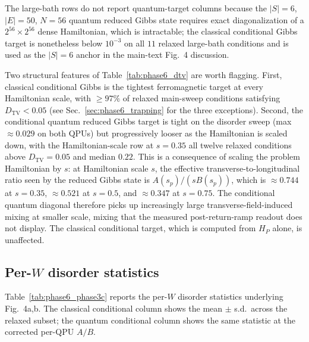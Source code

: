\documentclass[aps,prapplied,reprint,superscriptaddress,floatfix,nofootinbib]{revtex4-2}
\begin{document}
The large-bath rows do not report quantum-target columns because the
$|S|=6$, $|E|=50$, $N=56$ quantum reduced Gibbs state requires exact
diagonalization of a $2^{56}\times 2^{56}$ dense Hamiltonian, which is
intractable; the classical conditional Gibbs target is nonetheless
below $10^{-3}$ on all $11$ relaxed large-bath conditions and is used
as the $|S|=6$ anchor in the main-text Fig.~4 discussion.

Two structural features of
Table~\ref{tab:phase6_dtv} are worth flagging.  First, classical
conditional Gibbs is the tightest ferromagnetic target at every
Hamiltonian scale, with $\ge 97\%$ of relaxed main-sweep conditions
satisfying $D_\mathrm{TV}<0.05$ (see
Sec.~\ref{sec:phase6_trapping} for the three exceptions).  Second, the
conditional quantum reduced Gibbs target is tight on the disorder sweep
(max $\approx 0.029$ on both QPUs) but progressively looser as the
Hamiltonian is scaled down, with the Hamiltonian-scale row at $s=0.35$
all twelve relaxed conditions above $D_\mathrm{TV}=0.05$ and median
$0.22$.  This is a consequence of scaling the problem Hamiltonian by
$s$: at Hamiltonian scale $s$, the effective transverse-to-longitudinal
ratio seen by the reduced Gibbs state is $A(s_p)/(sB(s_p))$, which is
$\approx 0.744$ at $s=0.35$, $\approx 0.521$ at $s=0.5$, and
$\approx 0.347$ at $s=0.75$.  The conditional quantum diagonal
therefore picks up increasingly large transverse-field-induced mixing
at smaller scale, mixing that the measured post-return-ramp readout
does not display.  The classical conditional target, which is
computed from $H_P$ alone, is unaffected.

\subsection{Per-$W$ disorder statistics}
\label{sec:phase6_phase3c}

Table~\ref{tab:phase6_phase3c} reports the per-$W$ disorder statistics
underlying Fig.~4a,b.  The classical conditional column shows the
mean $\pm$ s.d.\ across the relaxed subset; the quantum conditional
column shows the same statistic at the corrected per-QPU $A/B$.
\end{document}
